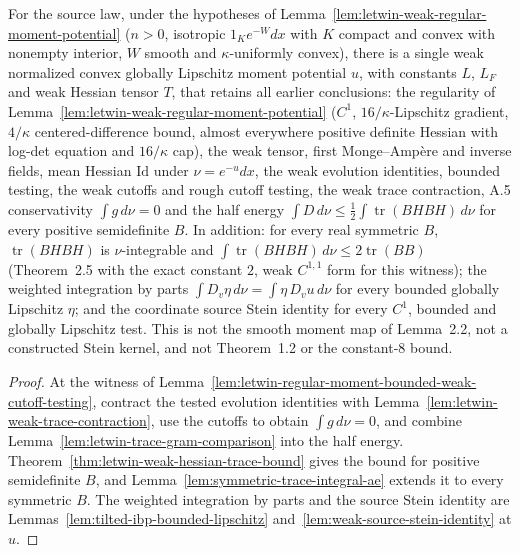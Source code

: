 \begin{theorem}
  \label{thm:letwin-regular-moment-weak-stein-coupling}
  \leanok
  For the source law, under the hypotheses of Lemma~\ref{lem:letwin-weak-regular-moment-potential} ($n>0$, isotropic $1_Ke^{-W}dx$ with $K$ compact and convex with
  nonempty interior, $W$ smooth and $\kappa$-uniformly convex), there is a single weak normalized convex globally Lipschitz moment potential $u$,
  with constants $L$, $L_F$ and weak Hessian tensor $T$, that retains all earlier conclusions: the regularity of Lemma~\ref{lem:letwin-weak-regular-moment-potential} ($C^1$, $16/\kappa$-Lipschitz
  gradient, $4/\kappa$ centered-difference bound, almost everywhere positive definite Hessian with log-det equation and $16/\kappa$ cap), the
  weak tensor, first Monge--Amp\`ere and inverse fields, mean Hessian $\mathrm{Id}$ under $\nu=e^{-u}dx$, the weak evolution identities,
  bounded testing, the weak cutoffs and rough cutoff testing, the weak trace contraction, A.5 conservativity $\int g\,d\nu=0$ and the half
  energy $\int D\,d\nu\le\frac12\int\operatorname{tr}(BHBH)\,d\nu$ for every positive semidefinite $B$. In addition: for every real symmetric
  $B$, $\operatorname{tr}(BHBH)$ is $\nu$-integrable and $\int\operatorname{tr}(BHBH)\,d\nu\le2\operatorname{tr}(BB)$ (Theorem~2.5 with the
  exact constant $2$, weak $C^{1,1}$ form for this witness); the weighted integration by parts $\int D_v\eta\,d\nu=\int\eta\,D_vu\,d\nu$ for
  every bounded globally Lipschitz $\eta$; and the coordinate source Stein identity for every $C^1$, bounded and globally Lipschitz test.
  This is not the smooth moment map of Lemma~2.2, not a constructed Stein kernel, and not Theorem~1.2 or the constant-8 bound.
\end{theorem}
\begin{proof}
  \leanok
  At the witness of Lemma~\ref{lem:letwin-regular-moment-bounded-weak-cutoff-testing}, contract the tested evolution identities with
  Lemma~\ref{lem:letwin-weak-trace-contraction}, use the cutoffs to obtain $\int g\,d\nu=0$, and combine
  Lemma~\ref{lem:letwin-trace-gram-comparison} into the half energy. Theorem~\ref{thm:letwin-weak-hessian-trace-bound} gives the bound for
  positive semidefinite $B$, and Lemma~\ref{lem:symmetric-trace-integral-ae} extends it to every symmetric $B$. The weighted integration by
  parts and the source Stein identity are Lemmas~\ref{lem:tilted-ibp-bounded-lipschitz} and~\ref{lem:weak-source-stein-identity} at $u$.
\end{proof}


